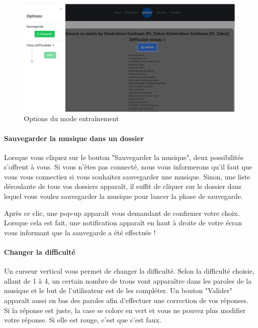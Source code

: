 \documentclass[12pt,french]{article}
\begin{document}
\bigskip

\begin{figure}[H]
	\centering
	\includegraphics[scale=0.25]{optionparole.png}
	\caption{Options du mode entraînement}
\end{figure}

\paragraph{Sauvegarder la musique dans un dossier\\}

Lorsque vous cliquez sur le bouton "Sauvegarder la musique", deux possibilités s'offrent à vous. Si vous n'êtes pas connecté, nous vous informerons qu'il faut que vous vous connectiez si vous souhaitez sauvegarder une musique. Sinon, une liste déroulante de tous vos dossiers apparaît, il suffit de cliquer sur le dossier dans lequel vous voulez sauvegarder la musique pour lancer la phase de sauvegarde.

Après ce clic, une pop-up apparaît vous demandant de confirmer votre choix. Lorsque cela est fait, une notification apparaît en haut à droite de votre écran vous informant que la sauvegarde a été effectuée !

\paragraph{Changer la difficulté}

Un curseur vertical vous permet de changer la difficulté. Selon la difficulté choisie, allant de 1 à 4, un certain nombre de trous vont apparaître dans les paroles de la musique et le but de l'utilisateur est de les compléter. Un bouton "Valider" apparaît aussi en bas des paroles afin d'effectuer une correction de vos réponses. Si la réponse est juste, la case se colore en vert et vous ne pouvez plus modifier votre réponse. Si elle est rouge, c'est que c'est faux.
\end{document}
